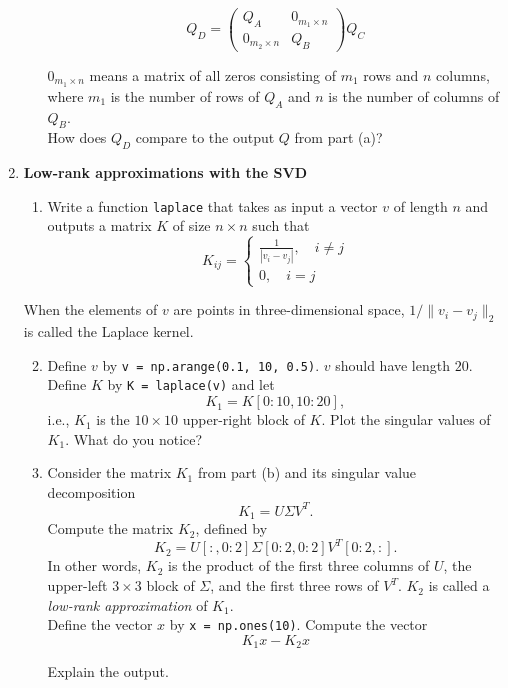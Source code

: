 \documentclass{article}
\newcounter{points}
\newcommand\printpoints{Total number of points: \thepoints}
\begin{document}
\begin{enumerate}
\begin{enumerate}
\[
Q_D = \begin{pmatrix} Q_A & 0_{m_1 \times n} \\ 0_{m_2 \times n} & Q_B \end{pmatrix}Q_C
\]

$0_{m_1 \times n}$ means a matrix of all zeros consisting of $m_1$ rows and $n$ columns, where $m_1$ is the number of rows of $Q_A$ and $n$ is the number of columns of $Q_B$. \\

How does $Q_D$ compare to the output $Q$ from part (a)?

\end{enumerate}

\newpage
\item \textbf{Low-rank approximations with the SVD} \\

\begin{enumerate}
\item Write a function \texttt{laplace} that takes as input a vector $v$ of length $n$ and outputs a matrix $K$ of size $n \times n$ such that
\[
K_{ij} = \left\{
     \begin{array}{lr}
       \frac{1}{|v_i - v_j|}, \quad i \neq j \\
       0, \quad i = j
     \end{array}
   \right.
\]
\end{enumerate}

When the elements of $v$ are points in three-dimensional space, $1 / \| v_i - v_j \|_2$ is called the Laplace kernel.

\begin{enumerate}
\setcounter{enumii}{1}
\item Define $v$ by \texttt{v = np.arange(0.1, 10, 0.5)}.  $v$ should have length $20$.  Define $K$ by \texttt{K = laplace(v)} and let
\[
K_1 = K[0:10, 10:20],
\]
i.e., $K_1$ is the $10 \times 10$ upper-right block of $K$.  Plot the singular values of $K_1$.  What do you notice?
\end{enumerate}


\begin{enumerate}
\setcounter{enumii}{2}
\item Consider the matrix $K_1$ from part (b) and its singular value decomposition
\[
K_1 = U\Sigma V^T.
\]
Compute the matrix $K_2$, defined by
\[
K_2 = U[:, 0:2]\Sigma[0:2, 0:2] V^T[0:2, :].
\]
In other words, $K_2$ is the product of the first three columns of $U$, the upper-left $3 \times 3$ block of $\Sigma$, and the first three rows of $V^T$. $K_2$ is called a \emph{low-rank approximation} of $K_1$. \\

Define the vector $x$ by \texttt{x = np.ones(10)}.  Compute the vector
\[
K_1x - K_2x
\]

Explain the output.

\end{enumerate}




\end{enumerate}
\end{document}
